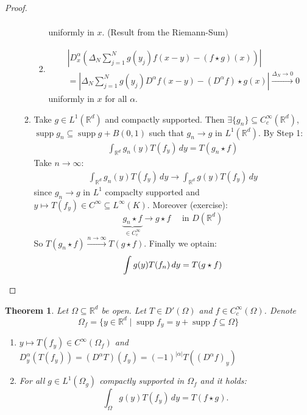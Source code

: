 \documentclass{report}
\theoremstyle{tommy}
\newtheorem{thm}[defn]{Theorem}
\newcommand{\supp}{\operatorname{supp}}
\begin{document}
\begin{proof}
\begin{enumerate}[label=\alph*)]
\begin{enumerate}[label=Step \arabic*:]
\begin{enumerate}[label=\arabic*)]
\begin{align*}
          \end{align*}
          uniformly in \(x\). (Result from the Riemann-Sum)
          \item \begin{align*}
            &\left| D_x^\alpha(\Delta_N \sum_{j=1}^N g(y_j) f(x-y) - (f \star g)(x)) \right| \\
            &= \left| \Delta_N \sum_{j=1}^N g(y_j) D^\alpha f(x-y) - (D^\alpha f)\star g(x) \right| \xrightarrow{\Delta_N \to 0} 0
          \end{align*}
          uniformly in \(x\) for all \(\alpha\).
        \end{enumerate}
        \item Take \(g \in L^1(\mathbb{R}^d)\) and compactly supported. Then \(\exists \{g_n\} \subseteq C_c^\infty(\mathbb{R}^d)\), \(\supp g_n \subseteq \supp g + B(0,1)\) such that \(g_n \to g\) in \(L^1(\mathbb{R}^d)\). By Step 1: 
        \begin{align*}
          \int_{\mathbb{R}^d} g_n(y) T(f_y) \, dy = T(g_n \star f)
        \end{align*}
        Take \(n \to \infty\):
        \begin{align*}
          \int_{\mathbb{R}^d} g_n(y) T(f_y) \, dy \to \int_{\mathbb{R}^d} g(y) T(f_y) \, dy
        \end{align*}
        since \(g_n \to g\) in \(L^1\) compaclty supported and \(y \mapsto T(f_y) \in C^\infty \subseteq L^\infty(K)\). Moreover (exercise):
        \[\underbrace{g_n \star f}_{\in C_c^\infty} \to g \star f \quad \text{ in } D(\mathbb{R}^d)\]
        So \(T(g_n \star f) \xrightarrow{n \to \infty} T(g \star f)\).
        Finally we optain:
        \[\int g(y) T(f_n) \, dy = T(g \star f)\qedhere\] 
      \end{enumerate}
  \end{enumerate}
  \end{proof}
  
  \begin{thm}
    Let \(\Omega \subseteq \mathbb{R}^d\) be open. Let \(T \in D'(\Omega)\) and \(f \in C_c^\infty(\Omega)\). Denote
    \[\Omega_f = \{y \in \mathbb{R}^d \mid \supp f_y = y + \supp f \subseteq \Omega\}\]
    \begin{enumerate}[label=\alph*)]
      \item \(y \mapsto T(f_y) \in C^\infty(\Omega_f)\) and \(D_y^\alpha(T(f_y)) = (D^\alpha T)(f_y) = (-1)^{|\alpha|}T((D^\alpha f)_y)\)
      \item For all \(g \in L^1(\Omega_g)\) compactly supported in \(\Omega_f\) and it holds:
      \[\int_\Omega g(y) T(f_y) \, dy = T(f \star g).\]
    \end{enumerate}
  \end{thm}
  
\end{document}
